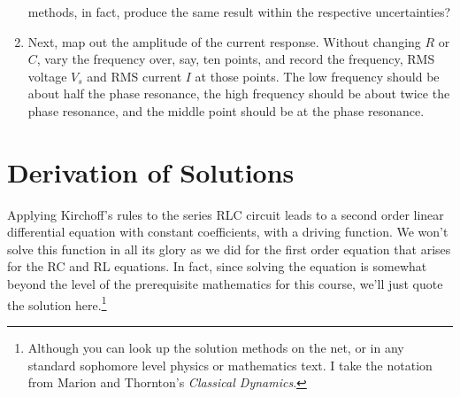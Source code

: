 \documentclass[12pt]{article}
\begin{document}
\begin{enumerate}
  methods, in fact, produce the same result within the respective
  uncertainties?
\item \label{item:current_response} Next, map out the amplitude of the
  current response.  Without changing $R$ or $C$, vary the frequency
  over, say, ten points, and record the frequency, RMS voltage $V_s$
  and RMS current $I$ at those points.  The low frequency should be
  about half the phase resonance, the high frequency should be about
  twice the phase resonance, and the middle point should be at the
  phase resonance.

\end{enumerate}

\appendix

\section{Derivation of Solutions}
\label{sec:solutions}

Applying Kirchoff's rules to the series RLC circuit leads to a second
order linear differential equation with constant coefficients, with a
driving function.  We won't solve this function in all its glory as we
did for the first order equation that arises for the RC and RL
equations.  In fact, since solving the equation is somewhat beyond the
level of the prerequisite mathematics for this course, we'll just
quote the solution here.\footnote{Although you can look up the
  solution methods on the net, or in any standard sophomore level
  physics or mathematics text.  I take the notation from Marion and
  Thornton's \textit{Classical Dynamics}.}
\end{document}
